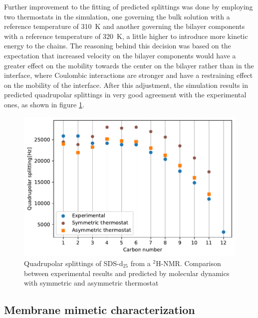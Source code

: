 \documentclass[3p,preprint,review]{elsarticle}
\begin{document}
	Further improvement to the fitting of predicted splittings was done by
	employing
	two thermostats in the simulation, one governing the bulk solution with a
	reference temperature of \SI{310}{K} and another governing the bilayer
	components with a reference temperature of \SI{320}{K}, a little higher to
	introduce more kinetic energy to the chains. The reasoning behind
	this decision was based on the expectation that increased velocity on the
	bilayer components would have a greater effect on the mobility towards the
	center on the bilayer rather than in the interface, where Coulombic
	interactions
	are stronger and have a restraining effect on the mobility of the interface.
	After
	this adjustment, the simulation results in predicted quadrupolar splittings in
	very good agreement with the experimental ones, as shown in figure
	\ref{fig:2nd_calibration}.
	
	\begin{figure}[h]
		\centering
		\includegraphics[width=\columnwidth]{calibration2}
		\caption{Quadrupolar splittings of SDS-d$_{25}$ from a $^2$H-NMR. Comparison
			between experimental results and predicted by molecular dynamics with
			symmetric and asymmetric thermostat}
		\label{fig:2nd_calibration}
	\end{figure}
	
	\subsection{Membrane mimetic characterization}
	\label{sec:characterization}
	
\end{document}
